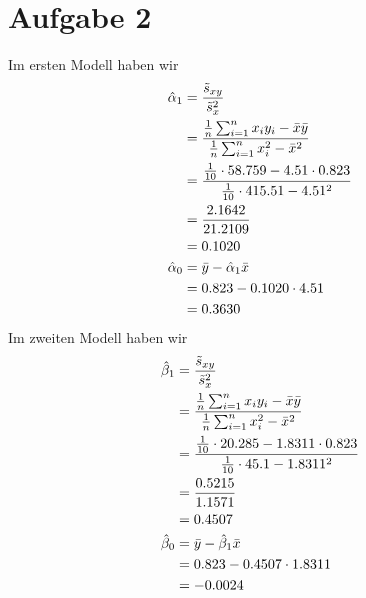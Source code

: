 \documentclass{article}
\begin{document}
	\section*{Aufgabe 2}
	Im ersten Modell haben wir
	\begin{align}
		\hat{\alpha}_1 &= \frac{\tilde{s}_{xy}}{\tilde{s}_x^2} \notag \\
		&= \frac{\frac{1}{n}\sum_{i=1}^{n} x_iy_i-\bar{x}\bar{y}}{\frac{1}{n}\sum_{i=1}^n x_i^2-\bar{x}^2} \notag \\
		&= \frac{\frac{1}{10}\cdot 58.759 - 4.51\cdot 0.823}{\frac{1}{10}\cdot 415.51- 4.51^2} \notag \\
		&= \frac{2.1642}{21.2109} \notag \\
		&= 0.1020 \notag \\
		\hat{\alpha}_0 &= \bar{y} - \hat{\alpha}_1\bar{x} \notag \\
		&= 0.823-0.1020\cdot 4.51 \notag \\
		&= 0.3630 \notag
	\end{align}
	Im zweiten Modell haben wir
	\begin{align}
		\hat{\beta}_1 &= \frac{\tilde{s}_{xy}}{\tilde{s}_x^2} \notag \\
		&= \frac{\frac{1}{n}\sum_{i=1}^{n} x_iy_i-\bar{x}\bar{y}}{\frac{1}{n}\sum_{i=1}^n x_i^2-\bar{x}^2} \notag \\
		&= \frac{\frac{1}{10}\cdot 20.285 - 1.8311\cdot 0.823}{\frac{1}{10}\cdot 45.1- 1.8311^2} \notag \\
		&= \frac{0.5215}{1.1571} \notag \\
		&= 0.4507 \notag \\
		\hat{\beta}_0 &= \bar{y} - \hat{\beta}_1\bar{x} \notag \\
		&= 0.823-0.4507\cdot 1.8311 \notag \\
		&= -0.0024 \notag
	\end{align}
\end{document}
